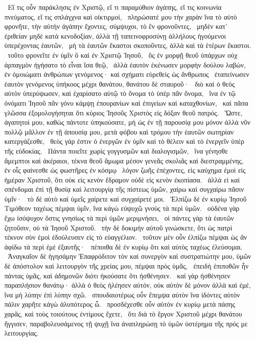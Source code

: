 ~Εἴ τις οὖν παράκλησις ἐν Χριστῷ, εἴ τι παραμύθιον ἀγάπης, εἴ τις κοινωνία πνεύματος, εἴ τις σπλάγχνα καὶ οἰκτιρμοί,
~πληρώσατέ μου τὴν χαρὰν ἵνα τὸ αὐτὸ φρονῆτε, τὴν αὐτὴν ἀγάπην ἔχοντες, σύμψυχοι, τὸ ἓν φρονοῦντες,
~μηδὲν κατ’ ἐριθείαν μηδὲ κατὰ κενοδοξίαν, ἀλλὰ τῇ ταπεινοφροσύνῃ ἀλλήλους ἡγούμενοι ὑπερέχοντας ἑαυτῶν,
~μὴ τὰ ἑαυτῶν ἕκαστοι σκοποῦντες, ἀλλὰ καὶ τὰ ἑτέρων ἕκαστοι.
~τοῦτο φρονεῖτε ἐν ὑμῖν ὃ καὶ ἐν Χριστῷ Ἰησοῦ,
~ὃς ἐν μορφῇ θεοῦ ὑπάρχων οὐχ ἁρπαγμὸν ἡγήσατο τὸ εἶναι ἴσα θεῷ,
~ἀλλὰ ἑαυτὸν ἐκένωσεν μορφὴν δούλου λαβών, ἐν ὁμοιώματι ἀνθρώπων γενόμενος· καὶ σχήματι εὑρεθεὶς ὡς ἄνθρωπος
~ἐταπείνωσεν ἑαυτὸν γενόμενος ὑπήκοος μέχρι θανάτου, θανάτου δὲ σταυροῦ·
~διὸ καὶ ὁ θεὸς αὐτὸν ὑπερύψωσεν, καὶ ἐχαρίσατο αὐτῷ τὸ ὄνομα τὸ ὑπὲρ πᾶν ὄνομα,
~ἵνα ἐν τῷ ὀνόματι Ἰησοῦ πᾶν γόνυ κάμψῃ ἐπουρανίων καὶ ἐπιγείων καὶ καταχθονίων,
~καὶ πᾶσα γλῶσσα ἐξομολογήσηται ὅτι κύριος Ἰησοῦς Χριστὸς εἰς δόξαν θεοῦ πατρός.
~Ὥστε, ἀγαπητοί μου, καθὼς πάντοτε ὑπηκούσατε, μὴ ὡς ἐν τῇ παρουσίᾳ μου μόνον ἀλλὰ νῦν πολλῷ μᾶλλον ἐν τῇ ἀπουσίᾳ μου, μετὰ φόβου καὶ τρόμου τὴν ἑαυτῶν σωτηρίαν κατεργάζεσθε,
~θεὸς γάρ ἐστιν ὁ ἐνεργῶν ἐν ὑμῖν καὶ τὸ θέλειν καὶ τὸ ἐνεργεῖν ὑπὲρ τῆς εὐδοκίας.
~Πάντα ποιεῖτε χωρὶς γογγυσμῶν καὶ διαλογισμῶν,
~ἵνα γένησθε ἄμεμπτοι καὶ ἀκέραιοι, τέκνα θεοῦ ἄμωμα μέσον γενεᾶς σκολιᾶς καὶ διεστραμμένης, ἐν οἷς φαίνεσθε ὡς φωστῆρες ἐν κόσμῳ
~λόγον ζωῆς ἐπέχοντες, εἰς καύχημα ἐμοὶ εἰς ἡμέραν Χριστοῦ, ὅτι οὐκ εἰς κενὸν ἔδραμον οὐδὲ εἰς κενὸν ἐκοπίασα.
~ἀλλὰ εἰ καὶ σπένδομαι ἐπὶ τῇ θυσίᾳ καὶ λειτουργίᾳ τῆς πίστεως ὑμῶν, χαίρω καὶ συγχαίρω πᾶσιν ὑμῖν·
~τὸ δὲ αὐτὸ καὶ ὑμεῖς χαίρετε καὶ συγχαίρετέ μοι.
~Ἐλπίζω δὲ ἐν κυρίῳ Ἰησοῦ Τιμόθεον ταχέως πέμψαι ὑμῖν, ἵνα κἀγὼ εὐψυχῶ γνοὺς τὰ περὶ ὑμῶν.
~οὐδένα γὰρ ἔχω ἰσόψυχον ὅστις γνησίως τὰ περὶ ὑμῶν μεριμνήσει,
~οἱ πάντες γὰρ τὰ ἑαυτῶν ζητοῦσιν, οὐ τὰ Ἰησοῦ Χριστοῦ.
~τὴν δὲ δοκιμὴν αὐτοῦ γινώσκετε, ὅτι ὡς πατρὶ τέκνον σὺν ἐμοὶ ἐδούλευσεν εἰς τὸ εὐαγγέλιον.
~τοῦτον μὲν οὖν ἐλπίζω πέμψαι ὡς ἂν ἀφίδω τὰ περὶ ἐμὲ ἐξαυτῆς·
~πέποιθα δὲ ἐν κυρίῳ ὅτι καὶ αὐτὸς ταχέως ἐλεύσομαι.
~Ἀναγκαῖον δὲ ἡγησάμην Ἐπαφρόδιτον τὸν  καὶ συνεργὸν καὶ συστρατιώτην μου, ὑμῶν δὲ ἀπόστολον καὶ λειτουργὸν τῆς χρείας μου, πέμψαι πρὸς ὑμᾶς,
~ἐπειδὴ ἐπιποθῶν ἦν πάντας ὑμᾶς, καὶ ἀδημονῶν διότι ἠκούσατε ὅτι ἠσθένησεν.
~καὶ γὰρ ἠσθένησεν παραπλήσιον θανάτῳ· ἀλλὰ ὁ θεὸς ἠλέησεν αὐτόν, οὐκ αὐτὸν δὲ μόνον ἀλλὰ καὶ ἐμέ, ἵνα μὴ λύπην ἐπὶ λύπην σχῶ.
~σπουδαιοτέρως οὖν ἔπεμψα αὐτὸν ἵνα ἰδόντες αὐτὸν πάλιν χαρῆτε κἀγὼ ἀλυπότερος ὦ.
~προσδέχεσθε οὖν αὐτὸν ἐν κυρίῳ μετὰ πάσης χαρᾶς, καὶ τοὺς τοιούτους ἐντίμους ἔχετε,
~ὅτι διὰ τὸ ἔργον Χριστοῦ μέχρι θανάτου ἤγγισεν, παραβολευσάμενος τῇ ψυχῇ ἵνα ἀναπληρώσῃ τὸ ὑμῶν ὑστέρημα τῆς πρός με λειτουργίας.

